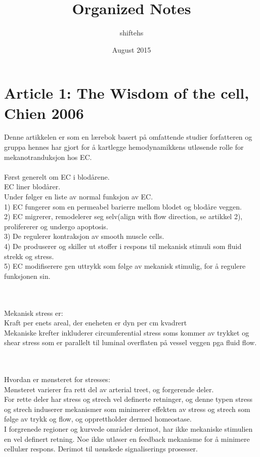 \documentclass{article}
\title{Organized Notes}
\author{shiftehs }
\date{August 2015}
\begin{document}
\maketitle

\section{Article 1: The Wisdom of the cell, Chien 2006}


Denne artikkelen er som en lærebok basert på omfattende studier forfatteren og gruppa hennes har gjort for å kartlegge hemodynamikkens utløsende rolle for mekanotranduksjon hos EC.
\\
\\ Først generelt om EC i blodårene. 
\\ EC liner blodårer. 
\\ Under følger en liste av normal funksjon av EC. 
\\1) EC fungerer som en permeabel barierre mellom blodet og blodåre veggen. 
\\2) EC migrerer, remodelerer seg selv(align with flow direction, se artikkel 2), prolifererer og undergo apoptosis. 
\\3) De regulerer kontraksjon av smooth muscle cells. 
\\4) De produserer og skiller ut stoffer i respons til mekanisk stimuli som fluid strekk og stress. 
\\5) EC modifiserere gen uttrykk som følge av mekanisk stimulig, for å regulere funksjonen sin.

\\
\\Mekanisk stress er:
\\ Kraft per enets areal, der eneheten er dyn per cm kvadrert
\\ Mekaniske krefter inkluderer circumferential stress soms kommer av trykket og shear stress som er parallelt til luminal overflaten på vessel veggen pga fluid flow. 

\\
\\Hvordan er mønsteret for stresses: 
\\Mønsteret varierer fra rett del av arterial treet, og forgerende deler. 
\\ For rette deler har stress og strech vel definerte retninger, og denne typen stress og strech induserer mekanismer som minimerer effekten av stress og strech som følge av trykk og flow, og opprettholder dermed homeostase. 
\\I forgrenede regioner og kurvede områder derimot, har ikke mekaniske stimulien en vel definert retning. Noe ikke utløser en feedback mekanisme for å minimere cellulær respons. Derimot til uønskede signaliserings prosesser. 
\end{document}
